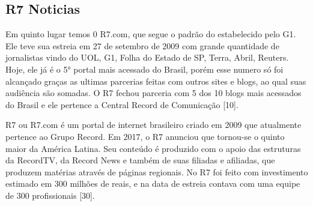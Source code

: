 \documentclass[a4paper]{article}
\begin{document}
\begin{titlepage}
\subsection{R7 Noticias}

Em quinto lugar temos 0 R7.com, que segue o padrão do estabelecido pelo G1. Ele teve sua estreia em 27 de setembro de 2009 com grande quantidade de jornalistas vindo do UOL, G1, Folha do Estado de SP, Terra, Abril, Reuters. Hoje, ele já é o 5° portal mais acessado do Brasil, porém esse numero só foi alcançado graças as ultimas parcerias feitas com outros sites e blogs, ao qual suas audiência são somadas. O R7 fechou parceria com 5 dos 10 blogs mais acessados do Brasil e ele pertence a Central Record de Comunicação [10].

R7 ou R7.com é um portal de internet brasileiro criado em 2009 que atualmente pertence ao Grupo Record. Em 2017, o R7 anunciou que tornou-se o quinto maior da América Latina. Seu conteúdo é produzido com o apoio das estruturas da RecordTV, da Record News e também de suas filiadas e afiliadas, que produzem matérias através de páginas regionais. No R7 foi feito com investimento estimado em 300 milhões de reais, e na data de estreia contava com uma equipe de 300 profissionais [30].


\end{titlepage}
\end{document}
